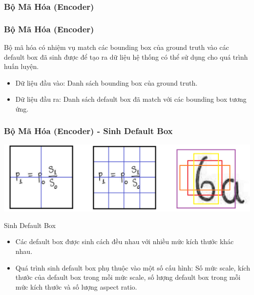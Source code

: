 \documentclass{beamer}
\begin{document}
	
	
	
	
	
	\subsubsection{Bộ Mã Hóa (Encoder)}
	
	\begin{frame}
		\frametitle{Bộ Mã Hóa (Encoder)}
		
		Bộ mã hóa có nhiệm vụ match các bounding box của ground truth vào các default box đã sinh được để tạo ra dữ liệu hệ thống có thể sử dụng cho quá trình huấn luyện.\\
		
		\begin{itemize}
			\item Dữ liệu đầu vào: Danh sách bounding box của ground truth.
			\item Dữ liệu đầu ra: Danh sách default box đã match với các bounding box tương ứng.
		\end{itemize}	
		
	\end{frame}
	
	\begin{frame}
		\frametitle{Bộ Mã Hóa (Encoder) - Sinh Default Box}
		\begin{center}
			\centering
			\includegraphics[width=0.9\linewidth]{im_3.png}
			\vspace{0.5cm}
		\end{center}
		\begin{block}{Sinh Default Box}
			\begin{itemize}
				\item Các default box được sinh cách đều nhau với nhiều mức kích thước khác nhau.
				\item Quá trình sinh default box phụ thuộc vào một số cấu hình: Số mức scale, kích thước của default box trong mỗi mức scale, số lượng default box trong mỗi mức kích thước và số lượng aspect ratio.
			\end{itemize}
		\end{block}
	\end{frame}
	
\end{document}
